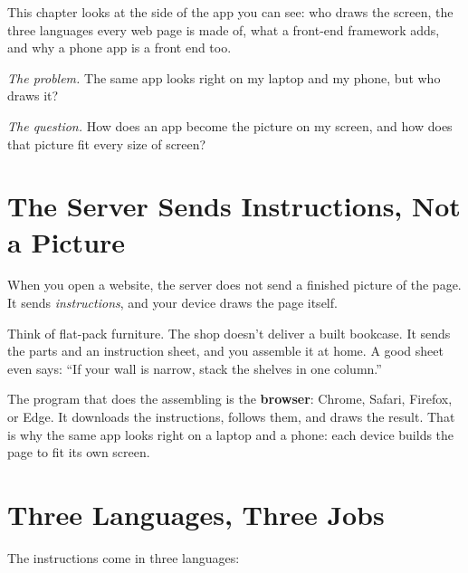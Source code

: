 
\begin{chapterintro}

This chapter looks at the side of the app you can see: who draws the screen, the three languages every web page is made of, what a front-end framework adds, and why a phone app is a front end too.

\end{chapterintro}

\emph{The problem.} The same app looks right on my laptop and my phone, but who draws it?

\emph{The question.} How does an app become the picture on my screen, and how does that picture fit every size of screen?

\section{The Server Sends Instructions, Not a Picture}\label{02-the-front-end:the-server-sends-instructions-not-a-picture}

When you open a website, the server does not send a finished picture of the page. It sends \emph{instructions}, and your device draws the page itself.

Think of flat-pack furniture. The shop doesn't deliver a built bookcase. It sends the parts and an instruction sheet, and you assemble it at home. A good sheet even says: ``If your wall is narrow, stack the shelves in one column.''

The program that does the assembling is the \textbf{browser}: Chrome, Safari, Firefox, or Edge. It downloads the instructions, follows them, and draws the result. That is why the same app looks right on a laptop and a phone: each device builds the page to fit its own screen.


\section{Three Languages, Three Jobs}\label{02-the-front-end:three-languages-three-jobs}

The instructions come in three languages:


